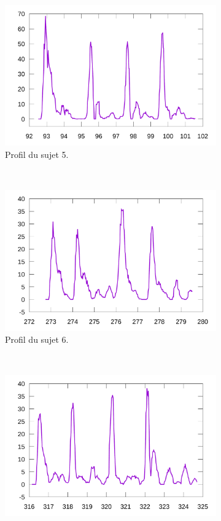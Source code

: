 	\begin{figure}[!htb]
		\centering
		\begin{subfigure}[t]{\subImgWlineplot}
			\centering
			\includegraphics[width=\textwidth]{figures/ch4/subject_05_rect_219_smoothed}
			\caption{Profil du sujet 5.}
			\label{fig:rectProfile5}
		\end{subfigure}
		~
		\begin{subfigure}[t]{\subImgWlineplot}
			\centering
			\includegraphics[width=\textwidth]{figures/ch4/subject_06_rect_219_smoothed}
			\caption{Profil du sujet 6.}
			\label{fig:rectProfile6}
		\end{subfigure}
		~
		\begin{subfigure}[t]{\subImgWlineplot}
			\centering
			\includegraphics[width=\textwidth]{figures/ch4/subject_08_rect_219_smoothed}

\end{subfigure}
\end{figure}
